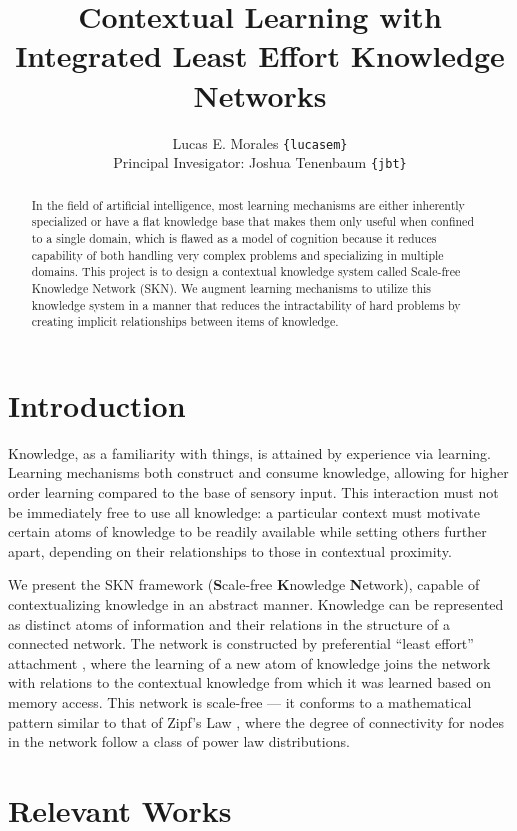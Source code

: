 \documentclass[11pt,letterpaper]{article}
\title{{Contextual Learning with Integrated Least Effort Knowledge Networks}}
\author{Lucas E. Morales \texttt{\{lucasem\}}\\
Principal Invesigator: Joshua Tenenbaum \texttt{\{jbt\}}}
\date{}
\begin{document}
\maketitle

\begin{abstract}
  In the field of artificial intelligence, most learning mechanisms are
  either inherently specialized or have a flat knowledge base that makes
  them only useful when confined to a single domain, which is flawed as a
  model of cognition because it reduces capability of both handling very
  complex problems and specializing in multiple domains. This project is to
  design a contextual knowledge system called Scale-free Knowledge Network
  (SKN). We augment learning mechanisms to utilize this knowledge system in
  a manner that reduces the intractability of hard problems by creating
  implicit relationships between items of knowledge.
\end{abstract}


\section{Introduction}

Knowledge, as a familiarity with things, is attained by experience via
learning. Learning mechanisms both construct and consume knowledge, allowing
for higher order learning compared to the base of sensory input. This
interaction must not be immediately free to use all knowledge: a particular
context must motivate certain atoms of knowledge to be readily available
while setting others further apart, depending on their relationships to
those in contextual proximity.

We present the SKN framework ({\bf S}cale-free {\bf K}nowledge {\bf
N}etwork), capable of contextualizing knowledge in an abstract manner.
Knowledge can be represented as distinct atoms of information and their
relations in the structure of a connected network. The network is
constructed by preferential ``least effort'' attachment
\cite{barabasi99}\cite{cancho03}, where the learning of a new atom of
knowledge joins the network with relations to the contextual knowledge from
which it was learned based on memory access. This network is scale-free ---
it conforms to a mathematical pattern similar to that of Zipf's Law
\cite{zipf49}, where the degree of connectivity for nodes in the network
follow a class of power law distributions.


\section{Relevant Works}
\end{document}
